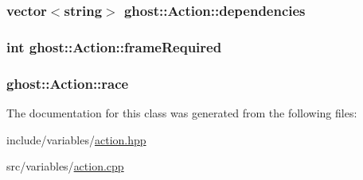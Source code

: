 \hypertarget{classghost_1_1Action_a0e7e5f84cc8d24bed8d83021602b02c2}{
\subsubsection[{dependencies}]{\setlength{\rightskip}{0pt plus 5cm}vector$<$string$>$ ghost\-::\-Action\-::dependencies\hspace{0.3cm}{\ttfamily [private]}}}\label{classghost_1_1Action_a0e7e5f84cc8d24bed8d83021602b02c2}
\hypertarget{classghost_1_1Action_a9b440d6806597b8f87f342a03fcaa39f}{
\subsubsection[{frame\-Required}]{\setlength{\rightskip}{0pt plus 5cm}int ghost\-::\-Action\-::frame\-Required\hspace{0.3cm}{\ttfamily [private]}}}\label{classghost_1_1Action_a9b440d6806597b8f87f342a03fcaa39f}
\hypertarget{classghost_1_1Action_a040eaa1d69dc99221cbdf48d84ce6edb}{
\subsubsection[{race}]{ ghost\-::\-Action\-::race\hspace{0.3cm}{\ttfamily [private]}}}\label{classghost_1_1Action_a040eaa1d69dc99221cbdf48d84ce6edb}


The documentation for this class was generated from the following files\-:\begin{DoxyCompactItemize}
\item 
include/variables/\hyperlink{action_8hpp}{action.\-hpp}\item 
src/variables/\hyperlink{action_8cpp}{action.\-cpp}\end{DoxyCompactItemize}
